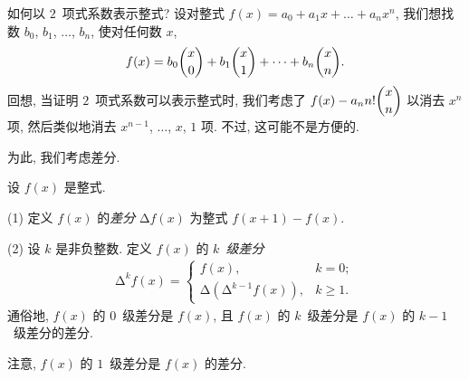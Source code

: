 \documentclass[../libro.tex]{subfiles}
\begin{document}
如何以 \(2\)~项式系数表示整式?
设对整式 \(f(x) = a_0 + a_1 x + \dots + a_n x^n\),
我们想找数 \(b_0\), \(b_1\), \(\dots\), \(b_n\),
使对任何数 \(x\),
\begin{align*}
    f(x) = b_0 \dbinom{x}{0} + b_1 \dbinom{x}{1} + \dots + b_n \dbinom{x}{n}.
\end{align*}
回想, 当证明 \(2\)~项式系数可以表示整式时,
我们考虑了 \(f(x) - a_n n! \dbinom{x}{n}\)
以消去 \(x^n\) 项,
然后类似地消去 \(x^{n-1}\), \(\dots\), \(x\), \(1\) 项.
不过, 这可能不是方便的.

为此, 我们考虑差分.

\begin{definition}
    设 \(f(x)\) 是整式.

    (1)
    定义 \(f(x)\) 的\emph{差分} \(\increment f (x)\)
    为整式 \(f(x + 1) - f(x)\).

    (2)
    设 \(k\) 是非负整数.
    定义 \(f(x)\) 的 \emph{\(k\)~级差分}
    \begin{align*}
        \increment^k f (x) =
        \begin{cases}
            f(x), & k = 0; \\
            \increment (\increment^{k-1} f (x)), & k \geq 1.
        \end{cases}
    \end{align*}
    通俗地, \(f(x)\) 的 \(0\)~级差分是 \(f(x)\),
    且 \(f(x)\) 的 \(k\)~级差分是 \(f(x)\) 的 \(k-1\)~级差分的差分.
\end{definition}

注意, \(f(x)\) 的 \(1\)~级差分是 \(f(x)\) 的差分.
\end{document}
